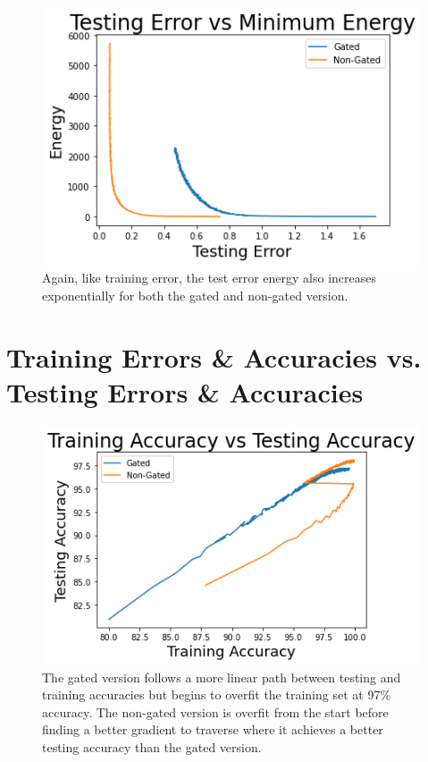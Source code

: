 \documentclass[prl,superscriptaddress,showpacs,twocolumn]{revtex4-1}
\begin{document}
\begin{figure}[H]
    \centering
    \includegraphics[width=\linewidth]{figures/testing_error_vs_minimum_energy.png}
    \caption{Again, like training error, the test error energy also increases exponentially for both the gated and non-gated version.}
    \label{fig:test_err_vs_min_energy}
\end{figure}

\section{Training Errors \& Accuracies vs. Testing Errors \& Accuracies}

\begin{figure}[H]
    \centering
    \includegraphics[width=\linewidth]{figures/training_accuracy_vs_testing_accuracy.png}
    \caption{The gated version follows a more linear path between testing and training accuracies but begins to overfit the training set at 97\% accuracy. The non-gated version is overfit from the start before finding a better gradient to traverse where it achieves a better testing accuracy than the gated version.}
    \label{fig:train_test_acc}
\end{figure}
\end{document}
